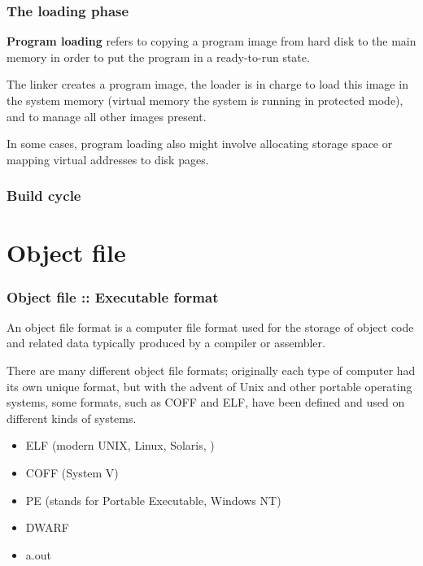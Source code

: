 
\begin{frame}
  \frametitle{The loading phase}

\textbf{Program loading} refers to copying a program image from hard disk to the main memory in
order to put the program in a ready-to-run state.

\-

The linker creates a program image, the loader is in charge to load this image in the
system memory (virtual memory the system is running in protected mode), and to manage
all other images present.

\-

In some cases, program loading also
might involve allocating storage space or mapping virtual addresses to disk pages.

\end{frame}


\begin{frame}
  \frametitle{Build cycle}

 \begin{center}
  \end{center}

\end{frame}



%
%

\section{Object file}


\begin{frame}
  \frametitle{Object file :: Executable format}

An object file format is a computer file format used for the storage of
object code and related data typically produced by a compiler or assembler.

\-

There are many different object file formats; originally each type of
computer had its own unique format, but with the advent of Unix and
other portable operating systems, some formats, such as COFF and ELF,
have been defined and used on different kinds of systems.

\-

\begin{itemize}
    \item
      ELF (modern UNIX, Linux, Solaris, \etc{})
    \item
	COFF (System V)
    \item
	PE (stands for Portable Executable, Windows NT)
    \item
	DWARF
        \item
a.out
  \end{itemize}

\end{frame}

